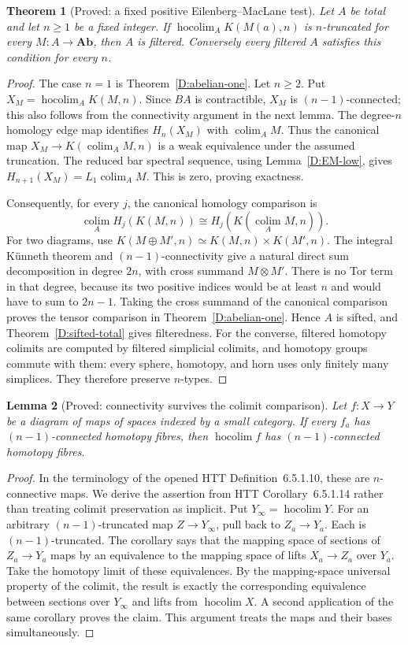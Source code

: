 \documentclass[11pt,a4paper]{article}
\newcommand{\Ab}{\mathbf{Ab}}
\newcommand{\colim}{\operatorname*{colim}}
\newcommand{\hocolim}{\operatorname*{hocolim}}
\newtheorem{theorem}{Theorem}[section]
\newtheorem{lemma}[theorem]{Lemma}
\theoremstyle{definition}
\begin{document}
\begin{theorem}[Proved: a fixed positive Eilenberg--MacLane test]\label{D:fixed-n}
Let $A$ be total and let $n\geq1$ be a fixed integer. If
$\hocolim_A K(M(a),n)$ is $n$-truncated for every $M:A\to\Ab$,
then $A$ is filtered. Conversely every filtered $A$ satisfies this
condition for every $n$.
\end{theorem}
\begin{proof}
The case $n=1$ is Theorem~\ref{D:abelian-one}. Let $n\geq2$.
Put $X_M=\hocolim_A K(M,n)$. Since $BA$ is contractible,
$X_M$ is $(n-1)$-connected; this also follows from the connectivity
argument in the next lemma. The degree-$n$ homology edge map
identifies $H_n(X_M)$ with $\colim_A M$. Thus the canonical map
$X_M\to K(\colim_A M,n)$ is a weak equivalence under the assumed
truncation. The reduced bar spectral sequence, using
Lemma~\ref{D:EM-low}, gives
$H_{n+1}(X_M)=L_1\colim_A M$. This is zero, proving exactness.

Consequently, for every $j$, the canonical homology comparison is
\[
\colim_A H_j(K(M,n))\cong H_j(K(\colim_A M,n)).
\] For two diagrams, use
$K(M\oplus M',n)\simeq K(M,n)\times K(M',n)$. The integral
K\"unneth theorem and $(n-1)$-connectivity give a natural direct
sum decomposition in degree $2n$, with cross summand $M\otimes M'$.
There is no Tor term in that degree, because its two positive
indices would be at least $n$ and would have to sum to $2n-1$.
Taking the cross summand of the canonical comparison proves the
tensor comparison in Theorem~\ref{D:abelian-one}. Hence $A$ is
sifted, and Theorem~\ref{D:sifted-total} gives filteredness.
For the converse, filtered homotopy colimits are computed by
filtered simplicial colimits, and homotopy groups commute with
them: every sphere, homotopy, and horn uses only finitely many
simplices. They therefore preserve $n$-types.
\end{proof}

\begin{lemma}[Proved: connectivity survives the colimit comparison]\label{D:connectivity}
Let $f:X\to Y$ be a diagram of maps of spaces indexed by a small
category. If every $f_a$ has $(n-1)$-connected homotopy fibres,
then $\hocolim f$ has $(n-1)$-connected homotopy fibres.
\end{lemma}
\begin{proof}
In the terminology of the opened HTT Definition~6.5.1.10, these
are $n$-connective maps. We derive the assertion from HTT
Corollary~6.5.1.14 \citep{Lurie2009HTT} rather than treating colimit preservation as
implicit. Put $Y_\infty=\hocolim Y$. For an arbitrary
$(n-1)$-truncated map $Z\to Y_\infty$, pull back to
$Z_a\to Y_a$. Each is $(n-1)$-truncated. The corollary says
that the mapping space of sections of $Z_a\to Y_a$ maps by an
equivalence to the mapping space of lifts $X_a\to Z_a$ over
$Y_a$. Take the homotopy limit of these equivalences. By the
mapping-space universal property of the colimit, the result is
exactly the corresponding equivalence between sections over
$Y_\infty$ and lifts from $\hocolim X$. A second application of
the same corollary proves the claim. This argument treats the maps
and their bases simultaneously.
\end{proof}
\end{document}

